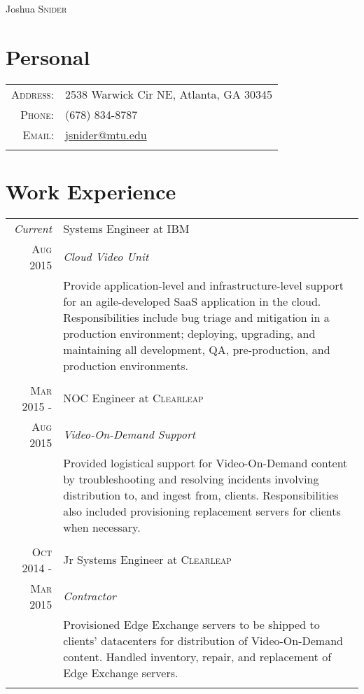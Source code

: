 \documentclass[a4paper,9pt]{extarticle}
\begin{document}
\pagestyle{empty}

\par{\centering
                {\Huge Joshua \textsc{Snider}
        }\bigskip\par}
\section{Personal}
\begin{tabular}{rl}
    \textsc{Address:}   & 2538 Warwick Cir NE, Atlanta, GA 30345\\
    \textsc{Phone:}     & (678) 834-8787\\
    \textsc{Email:}     & \href{mailto:jsnider@mtu.edu}{jsnider@mtu.edu}\\
    \multicolumn{2}{c}{}\\
\end{tabular}

\section{Work Experience}
\begin{tabular}{r|p{8.5cm}}
 \emph{Current}&Systems Engineer at \textsc{IBM}\\\textsc{Aug 2015}&\emph{Cloud Video Unit}\\&\footnotesize{Provide application-level and infrastructure-level support for an agile-developed SaaS application in the cloud. Responsibilities include bug triage and mitigation in a production environment; deploying, upgrading, and maintaining all development, QA, pre-production, and production environments.}\\\multicolumn{2}{c}{}\\
 \textsc{Mar 2015 -}&NOC Engineer at \textsc{Clearleap}\\\textsc{Aug 2015}&\emph{Video-On-Demand Support}\\&\footnotesize{Provided logistical support for Video-On-Demand content by troubleshooting and resolving incidents involving distribution to, and ingest from, clients. Responsibilities also included provisioning replacement servers for clients when necessary.}\\\multicolumn{2}{c}{}\\
 \textsc{Oct 2014 -}&Jr Systems Engineer at \textsc{Clearleap}\\\textsc{Mar 2015}&\emph{Contractor}\\&\footnotesize{Provisioned Edge Exchange servers to be shipped to clients' datacenters for distribution of Video-On-Demand content. Handled inventory, repair, and replacement of Edge Exchange servers.}\\\multicolumn{2}{c}{}\\
\end{tabular}
\end{document}
